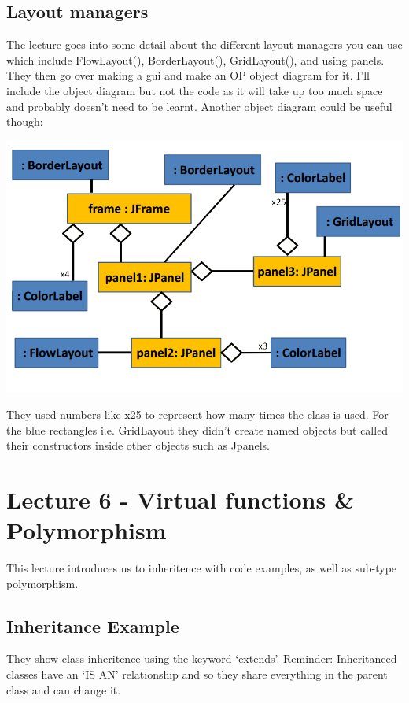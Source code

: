 \documentclass{article}
\begin{document}
\subsection{Layout managers}

The lecture goes into some detail about the different layout managers you can use which include
FlowLayout(), BorderLayout(), GridLayout(), and using panels. They then go over making a gui and
make an OP object diagram for it. I'll include the object diagram but not the code as it will take 
up too much space and probably doesn't need to be learnt. Another object diagram could be useful
though:

\begin{center}
\includegraphics[scale=0.45]{objectdiagram2.png}
\end{center}

They used numbers like x25 to represent how many times the class is used. For the blue rectangles
i.e. GridLayout they didn't create named objects but called their constructors inside other objects
such as Jpanels.

\section{Lecture 6 - Virtual functions \& Polymorphism}
This lecture introduces us to inheritence with code examples, as well as sub-type polymorphism.

\subsection{Inheritance Example}
They show class inheritence using the keyword `extends'. Reminder: Inheritanced classes have an
`IS AN' relationship and so they share everything in the parent class and can change it.
\end{document}

